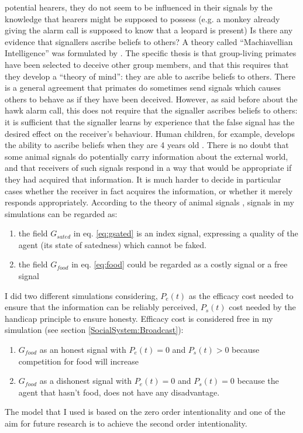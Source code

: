 potential hearers, they do not seem to be influenced in their signals by the
knowledge that hearers might be supposed to possess (e.g. a monkey already giving the
alarm call is supposed to know that a leopard is present) Is there any evidence that
signallers ascribe beliefs to others? A theory  called ``Machiavellian Intelligence''
was formulated by \citet{Byrne1988}. The specific thesis is that
group-living primates have been selected to deceive other group members, and that this
requires that they develop a ``theory of mind'': they are able to ascribe beliefs to others.
There is a general agreement that primates do sometimes send signals which causes others
to behave as if they have been deceived. However, as said before about the hawk alarm call,
 this does not require that the signaller ascribes beliefs to others: it is sufficient that
 the signaller learns by experience that the false signal has the desired effect on
 the receiver's behaviour.
Human children, for example, develops the ability to ascribe beliefs when they are 4 years old
\citep{WimmerPerner1983:ChildMind}.
There is no doubt that some animal signals do potentially carry information
about the external world, and that receivers of such signals respond in a way
that would be appropriate if they had acquired that information. It is much harder
 to decide in particular cases whether the receiver in fact acquires
the information, or whether it merely responds appropriately.
According to the theory of animal signals \citep{AnimalSignals}, signals in my simulations can
 be regarded as:
\begin{enumerate}
\item the field $G_{sated}$ in eq. \ref{eq:gsated} is an index signal, expressing
a quality of the agent (its state of satedness) which cannot be faked.
\item the field $G_{food}$ in eq. \ref{eq:food} could be regarded as a costly
signal or a free signal
\end{enumerate}
I did two different simulations considering, $P_{e}(t)$ as the efficacy cost
needed to ensure that the information can be reliably perceived, $P_{s}(t)$ cost
 needed by the handicap principle \citep{Zahavi1975:MateSelection} to ensure honesty.
Efficacy cost is considered free in my simulation (see section \ref{SocialSystem:Broadcast}):
\begin{enumerate}
\item $G_{food}$ as an honest signal with $P_{e}(t)=0$ and $P_{s}(t)>0$ because competition for food will increase
\item $G_{food}$ as a dishonest signal with $P_{e}(t)=0$ and $P_{s}(t)=0$ because the agent that hasn't food, does not have any disadvantage.
\end{enumerate}
The model that I used is based on the zero order intentionality and one of the aim
for future research is to achieve the second order intentionality.

